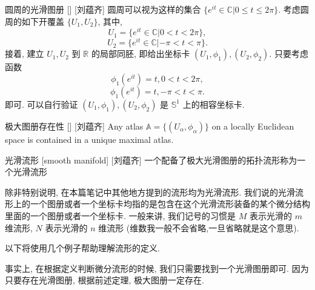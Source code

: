 \documentclass[UTF8]{ctexart}
\begin{document}
        \begin{xmp}
            []
            {圆周的光滑图册}
            []
            [刘蕴齐]
            圆周可以视为这样的集合 \(\{ e^{it} \in \mathbb{C} | 0 \leq t \leq 2 \pi \}\). 
            考虑圆周的如下开覆盖 \(\{U_1, U_2\}\), 其中, 
            \[
            U_1 = \{ e^{it} \in \mathbb{C} | 0 < t < 2 \pi \},
            \]
            \[
            U_2 = \{ e^{it} \in \mathbb{C} | -\pi < t < \pi \}.
            \]
            接着, 建立 \(U_1, U_2\) 到 \(\mathbb{R}\) 的局部同胚, 即给出坐标卡 \((U_1,\phi_1), (U_2, \phi_2)\). 只要考虑函数
            \[
            \phi_1(e^{it}) = t, 0 < t < 2 \pi,
            \]
            \[
            \phi_1(e^{it}) = t, -\pi < t < \pi.
            \]
            即可. 可以自行验证 \((U_1,\phi_1), (U_2, \phi_2)\) 是 \(\mathbb{S}^1\) 上的相容坐标卡. 
            
        \end{xmp}
        
        \begin{ppt}
            []
            {极大图册存在性}
            []
            [刘蕴齐]
            Any atlas  \(\mathbb{A} = \{(U_{\alpha},\phi_{\alpha})\}\)  on a locally Euclidean space is contained in a unique maximal atlas.
        \end{ppt}
        
        \begin{dfn}
            []
            {光滑流形}
            [smooth manifold]
            [刘蕴齐]
            一个配备了极大光滑图册的拓扑流形称为一个光滑流形
        \end{dfn}
        
        \begin{rmk}
            []
            除非特别说明, 在本篇笔记中其他地方提到的流形均为光滑流形. 我们说的光滑流形上的一个图册或者一个坐标卡均指的是包含在这个光滑流形装备的某个微分结构里面的一个图册或者一个坐标卡. 一般来讲, 我们记号的习惯是 \(M\) 表示光滑的 \(m\) 维流形,  \(N\) 表示光滑的 \(n\) 维流形 (维数我一般不会省略,一旦省略就是这个意思). 
        \end{rmk}
        
        以下将使用几个例子帮助理解流形的定义. 
        
        \begin{rmk}
            []
            事实上, 在根据定义判断微分流形的时候, 我们只需要找到一个光滑图册即可. 因为只要存在光滑图册, 根据前述定理, 极大图册一定存在. 
        \end{rmk}
        
\end{document}
